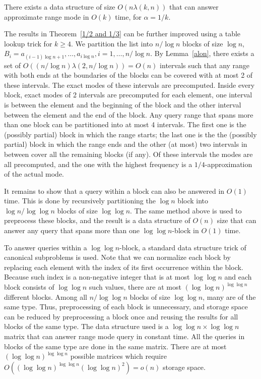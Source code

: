 \documentclass{llncs}
\begin{document}
\begin{theorem}\label{1/2 and 1/3}There exists a data structure of
  size $O(n\lambda(k,n))$ 
that can answer approximate 
range mode in $O(k)$ time, for $\alpha=1/k$.
\end{theorem}

The results in Theorem~\ref{1/2 and 1/3} can be further 
improved using a table lookup trick for $k \ge 4$. 
We partition the list into $n/\log n$ blocks of size 
$\log n$, $B_i=a_{(i-1)\log n +1},\ldots,a_{i\log n}, 
i =1, \ldots, n/\log n$. By Lemma~\ref{alon}, there exists 
a set of $O((n/\log n)\lambda(2,n/\log n))=O(n)$ 
intervals such that any range with both ends at the 
boundaries of the blocks can be covered with at most 
2 of these intervals. The exact modes of these intervals are
precomputed. Inside every block, exact modes of 2 
intervals are precomputed for each element, one interval is 
between the element and the beginning of
the block and the other interval between the element and the 
end of the block.
Any query range that spans more than one block can be partitioned 
into at most 4 intervals. The first one is the (possibly partial) 
block in which the range starts; the last one is the
the (possibly partial) block in which the range ends and the other 
(at most) two intervals in between 
cover all the remaining blocks (if any).  Of these intervals the 
modes are all precomputed, and the 
one with the highest frequency is a $1/4$-approximation of the 
actual mode. 

It remains to show that a query within a block can also be 
answered in $O(1)$ time. 
This is done by recursively partitioning the $\log n $ block 
into $\log n / \log\log n$ blocks of size 
$\log\log n$. The same method above is used to preprocess 
these blocks, and the result 
is a data structure of $O(n)$ size that can answer any query 
that spans more than one 
$\log\log n$-block in $O(1)$ time. 

To answer queries within a $\log\log n$-block, a standard data
structure trick \cite{gt85} of canonical subproblems is used. 
Note that we can normalize each block by replacing each 
element with
the index of its first occurrence within the block. Because 
such index
is a non-negative integer that is at most $\log\log n$ and each 
block consists of $\log\log n$ such
values, there are at most $(\log\log n) ^{\log\log n}$ different 
blocks. Among all
$n/\log\log n$ blocks of size $\log\log n$, many are of the 
same type. Thus, preprocessing of each block is unnecessary, and 
storage space 
can be reduced by preprocessing a block once and reusing the results for all blocks of 
the same type. The data structure used is a
$\log\log n \times \log\log n$ matrix that can answer range mode query in constant time.  
All the queries in blocks of the same type are done in the same matrix. There are at 
most $(\log\log n) ^{\log\log n}$ possible matrices which require $O((\log\log n) ^{\log\log n}(\log\log n)^2)=o(n)$ storage space.  
 
\end{document}
